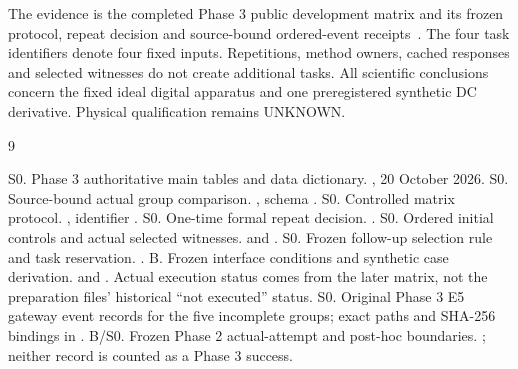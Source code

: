 \documentclass[10pt]{article}
\begin{document}
The evidence is the completed Phase 3 public development matrix and its frozen
protocol, repeat decision and source-bound ordered-event receipts~\cite{tables,comparison,protocol,freeze,ordered}.
The four task identifiers denote four fixed inputs. Repetitions, method owners,
cached responses and selected witnesses do not create additional tasks. All
scientific conclusions concern the fixed ideal digital apparatus and one
preregistered synthetic DC derivative. Physical qualification remains UNKNOWN.



\begin{thebibliography}{9}
\small\raggedright
{} S0. Phase 3 authoritative main tables and data dictionary.
, 20 October 2026.
 S0. Source-bound actual group comparison.
, schema .
 S0. Controlled matrix protocol.
, identifier .
 S0. One-time formal repeat decision.
.
 S0. Ordered initial controls and actual selected witnesses.
 and .
 S0. Frozen follow-up selection rule and task reservation.
.
 B. Frozen interface conditions and synthetic case derivation.
 and
. Actual execution status comes from the later matrix,
not the preparation files' historical ``not executed'' status.
 S0. Original Phase 3 E5 gateway event records for the five
incomplete groups; exact paths and SHA-256 bindings in .
 B/S0. Frozen Phase 2 actual-attempt and post-hoc boundaries.
; neither record is counted as a Phase 3 success.
\end{thebibliography}
\end{document}

